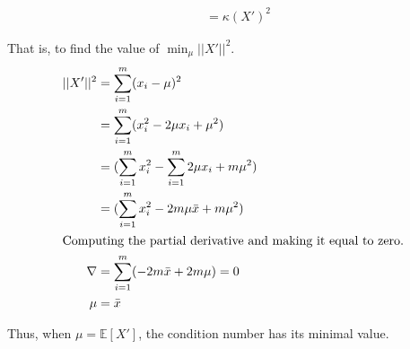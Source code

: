 \documentclass[letter, 12pt]{article}
\begin{document}
\begin{enumerate}
\begin{align*}
    		&= \kappa(X')^2
    	\end{align*}
    	\par{That is, to find the value of $ \min_\mu ||X'||^2 $.}
    	\begin{align*}
    		 ||X'||^2 &= \sum_{i=1}^m (x_i - \mu)^2 \\
    		 &= \sum_{i=1}^m (x_i^2 - 2\mu x_i + \mu^2) \\
    		 &= (\sum_{i=1}^m x_i^2 - \sum_{i=1}^m 2\mu x_i + m \mu^2) \\
    		 &= (\sum_{i=1}^m x_i^2 -  2 m \mu \bar{x} + m \mu^2) \\
    		 \shortintertext{Computing the partial derivative and making it equal to zero.}
    		 \nabla &= \sum_{i=1}^m (- 2m\bar{x} + 2m\mu) = 0\\
    		 \mu &= \bar{x}
    	\end{align*}
    	\par{Thus, when $ \mu = \mathbb{E}[X'] $, the condition number has its minimal value.}
    \end{enumerate}
\end{document}
